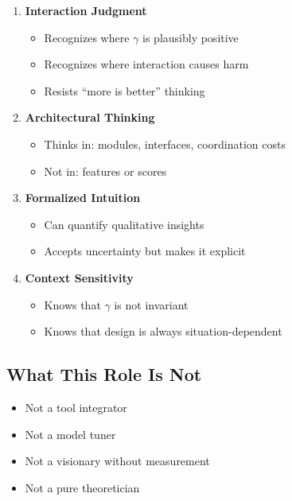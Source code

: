 \begin{enumerate}
    \item \textbf{Interaction Judgment}
    \begin{itemize}[nosep]
        \item Recognizes where $\gamma$ is plausibly positive
        \item Recognizes where interaction causes harm
        \item Resists ``more is better'' thinking
    \end{itemize}

    \item \textbf{Architectural Thinking}
    \begin{itemize}[nosep]
        \item Thinks in: modules, interfaces, coordination costs
        \item Not in: features or scores
    \end{itemize}

    \item \textbf{Formalized Intuition}
    \begin{itemize}[nosep]
        \item Can quantify qualitative insights
        \item Accepts uncertainty but makes it explicit
    \end{itemize}

    \item \textbf{Context Sensitivity}
    \begin{itemize}[nosep]
        \item Knows that $\gamma$ is not invariant
        \item Knows that design is always situation-dependent
    \end{itemize}
\end{enumerate}

\subsection{What This Role Is Not}

\begin{itemize}
    \item[$\times$] Not a tool integrator
    \item[$\times$] Not a model tuner
    \item[$\times$] Not a visionary without measurement
    \item[$\times$] Not a pure theoretician
\end{itemize}

